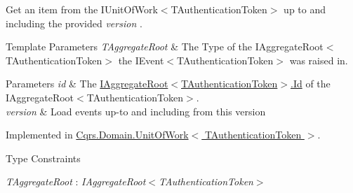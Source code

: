 Get an item from the I\+Unit\+Of\+Work$<$\+T\+Authentication\+Token$>$ up to and including the provided {\itshape version} . 


\begin{DoxyTemplParams}{Template Parameters}
{\em T\+Aggregate\+Root} & The Type of the I\+Aggregate\+Root$<$\+T\+Authentication\+Token$>$ the I\+Event$<$\+T\+Authentication\+Token$>$ was raised in.\\
\hline
\end{DoxyTemplParams}

\begin{DoxyParams}{Parameters}
{\em id} & The \hyperlink{interfaceCqrs_1_1Domain_1_1IAggregateRoot_a04aa3198f1371afa345a58e8fcb713d7_a04aa3198f1371afa345a58e8fcb713d7}{I\+Aggregate\+Root$<$\+T\+Authentication\+Token$>$.\+Id} of the I\+Aggregate\+Root$<$\+T\+Authentication\+Token$>$.\\
\hline
{\em version} & Load events up-\/to and including from this version\\
\hline
\end{DoxyParams}


Implemented in \hyperlink{classCqrs_1_1Domain_1_1UnitOfWork_aa0e705ac7f323abfb552bcbce2a7d692_aa0e705ac7f323abfb552bcbce2a7d692}{Cqrs.\+Domain.\+Unit\+Of\+Work$<$ T\+Authentication\+Token $>$}.

\begin{Desc}
\item[Type Constraints]\begin{description}
\item[{\em T\+Aggregate\+Root} : {\em I\+Aggregate\+Root$<$T\+Authentication\+Token$>$}]\end{description}
\end{Desc}
